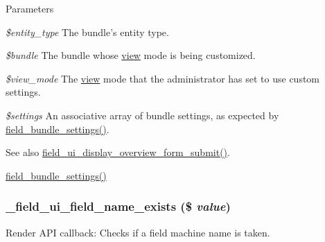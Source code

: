 \begin{DoxyParams}{Parameters}
\item[{\em \$entity\_\-type}]The bundle's entity type. \item[{\em \$bundle}]The bundle whose \hyperlink{classview}{view} mode is being customized. \item[{\em \$view\_\-mode}]The \hyperlink{classview}{view} mode that the administrator has set to use custom settings. \item[{\em \$settings}]An associative array of bundle settings, as expected by \hyperlink{group__field_gab6416216c1491d34f1bdc7ce38abfe8c}{field\_\-bundle\_\-settings()}.\end{DoxyParams}
\begin{DoxySeeAlso}{See also}
\hyperlink{field__ui_8admin_8inc_a06179df88eafaa552c7eeb5fdd144ccf}{field\_\-ui\_\-display\_\-overview\_\-form\_\-submit()}. 

\hyperlink{group__field_gab6416216c1491d34f1bdc7ce38abfe8c}{field\_\-bundle\_\-settings()} 
\end{DoxySeeAlso}
\hypertarget{field__ui_8admin_8inc_a31767c01b35190d495170c589b88475c}{
\subsubsection[{\_\-field\_\-ui\_\-field\_\-name\_\-exists}]{\setlength{\rightskip}{0pt plus 5cm}\_\-field\_\-ui\_\-field\_\-name\_\-exists (\$ {\em value})}}
\label{field__ui_8admin_8inc_a31767c01b35190d495170c589b88475c}
Render API callback: Checks if a field machine name is taken.


